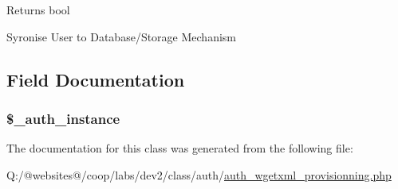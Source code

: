 \begin{DoxyReturn}{Returns}
bool 
\end{DoxyReturn}
Syronise User to Database/\-Storage Mechanism

\subsection{Field Documentation}
\hypertarget{class_xortify_auth_wgetxml_provisionning_a486ed878bb5a7188c99ac4c9ee46ac6e}{
\subsubsection[{\$\-\_\-auth\-\_\-instance}]{\setlength{\rightskip}{0pt plus 5cm}\$\-\_\-auth\-\_\-instance}}\label{class_xortify_auth_wgetxml_provisionning_a486ed878bb5a7188c99ac4c9ee46ac6e}


The documentation for this class was generated from the following file\-:\begin{DoxyCompactItemize}
\item 
Q\-:/@websites@/coop/labs/dev2/class/auth/\hyperlink{auth__wgetxml__provisionning_8php}{auth\-\_\-wgetxml\-\_\-provisionning.\-php}\end{DoxyCompactItemize}
